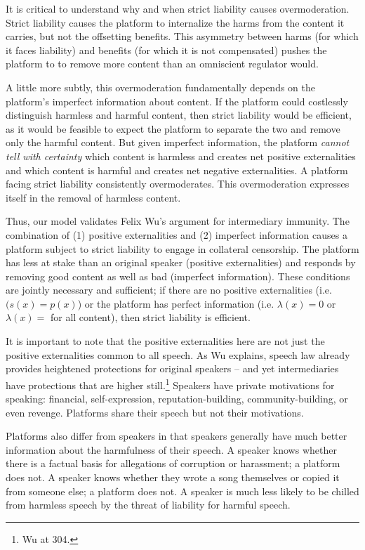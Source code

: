 It is critical to understand why and when strict liability causes overmoderation. Strict liability causes the platform to internalize the harms from the content it carries, but not the offsetting benefits. This asymmetry between harms (for which it faces liability) and benefits (for which it is not compensated) pushes the platform to to remove more content than an omniscient regulator would.

A little more subtly, this overmoderation fundamentally depends on the platform's imperfect information about content. If the platform could costlessly distinguish harmless and harmful content, then strict liability would be efficient, as it would be feasible to expect the platform to separate the two and remove only the harmful content. But given imperfect information, the platform \emph{cannot tell with certainty} which content is harmless and creates net positive externalities and which content is harmful and creates net negative externalities. A platform facing strict liability consistently overmoderates. This overmoderation expresses itself in the removal of harmless content.

Thus, our model validates Felix Wu's argument for intermediary immunity. The combination of (1) positive externalities and (2) imperfect information causes a platform subject to strict liability to engage in collateral censorship. The platform has less at stake than an original speaker (positive externalities) and responds by removing good content as well as bad (imperfect information). These conditions are jointly necessary and sufficient; if there are no positive externalities (i.e. $(s(x) = p(x)$) or the platform has perfect information (i.e. $\lambda(x) =0 $ or $\lambda(x) =$ for all content), then strict liability is efficient.

It is important to note that the positive externalities here are not just the positive externalities common to all speech. As Wu explains, speech law already provides heightened protections for original speakers -- and yet intermediaries have protections that are higher still.\footnote{Wu at 304.} Speakers have private motivations for speaking: financial, self-expression, reputation-building, community-building, or even revenge. Platforms share their speech but not their motivations.

Platforms also differ from speakers in that speakers generally have much better information about the harmfulness of their speech. A speaker knows whether there is a factual basis for allegations of corruption or harassment; a platform does not. A speaker knows whether they wrote a song themselves or copied it from someone else; a platform does not. A speaker is much less likely to be chilled from harmless speech by the threat of liability for harmful speech.

